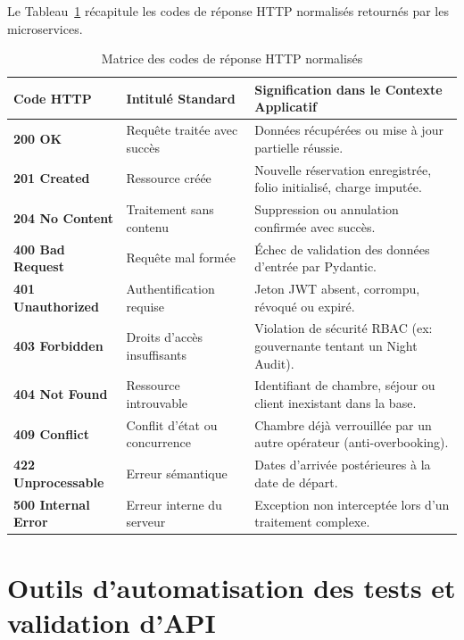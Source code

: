 \documentclass[12pt,a4paper,oneside]{report}
\begin{document}
Le Tableau~\ref{tab:api_codes_detail} récapitule les codes de réponse HTTP normalisés retournés par les microservices.

\begin{table}[H]
\centering
\small
\renewcommand{\arraystretch}{1.3}
\begin{tabularx}{\textwidth}{|p{2.5cm}|p{3.5cm}|X|}
\hline
\textbf{Code HTTP} & \textbf{Intitulé Standard} & \textbf{Signification dans le Contexte Applicatif} \\
\hline
\textbf{200 OK} & Requête traitée avec succès & Données récupérées ou mise à jour partielle réussie. \\
\hline
\textbf{201 Created} & Ressource créée & Nouvelle réservation enregistrée, folio initialisé, charge imputée. \\
\hline
\textbf{204 No Content} & Traitement sans contenu & Suppression ou annulation confirmée avec succès. \\
\hline
\textbf{400 Bad Request} & Requête mal formée & Échec de validation des données d'entrée par Pydantic. \\
\hline
\textbf{401 Unauthorized} & Authentification requise & Jeton JWT absent, corrompu, révoqué ou expiré. \\
\hline
\textbf{403 Forbidden} & Droits d'accès insuffisants & Violation de sécurité RBAC (ex: gouvernante tentant un Night Audit). \\
\hline
\textbf{404 Not Found} & Ressource introuvable & Identifiant de chambre, séjour ou client inexistant dans la base. \\
\hline
\textbf{409 Conflict} & Conflit d'état ou concurrence & Chambre déjà verrouillée par un autre opérateur (anti-overbooking). \\
\hline
\textbf{422 Unprocessable} & Erreur sémantique & Dates d'arrivée postérieures à la date de départ. \\
\hline
\textbf{500 Internal Error} & Erreur interne du serveur & Exception non interceptée lors d'un traitement complexe. \\
\hline
\end{tabularx}
\caption{Matrice des codes de réponse HTTP normalisés}
\label{tab:api_codes_detail}
\end{table}

\section{Outils d'automatisation des tests et validation d'API}
\end{document}
